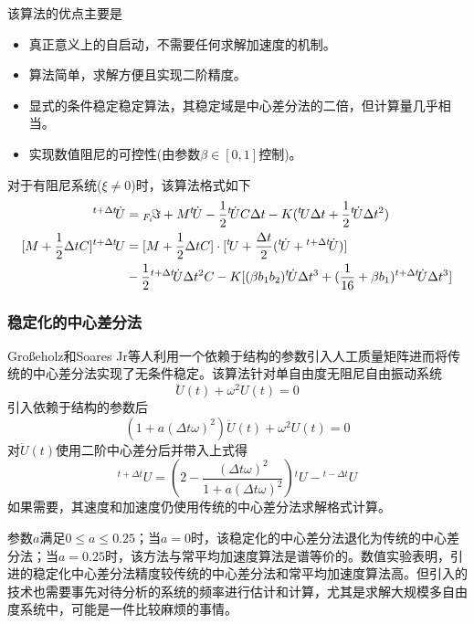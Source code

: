 该算法的优点主要是
\begin{itemize}
\item[\ddag] 真正意义上的自启动，不需要任何求解加速度的机制。
\item[\ddag] 算法简单，求解方便且实现二阶精度。
\item[\ddag] 显式的条件稳定稳定算法，其稳定域是中心差分法的二倍，但计算量几乎相当。
\item[\ddag] 实现数值阻尼的可控性(由参数$\beta\in[0,1]$控制)。
\end{itemize}

对于有阻尼系统($\xi\neq0$)时，该算法格式如下
\begin{align}
 [M+\frac{1}{2}\Delta tC]{^{t+\Delta t}\!\dot{U}}&={_{F_i}\!\Im}+M{^t\!\dot{U}}-\frac12{^{t}\!\dot{U}}C\Delta t-K({^t\!U}\Delta t+\frac12{^t\!\dot{U}}\Delta t^2)\\
 [M+\frac{1}{2}\Delta tC]{^{t+\Delta t}\!U}&=[M+\frac{1}{2}\Delta tC]\cdot[{^t\!U}+\frac{\Delta t}{2}({^t\!\dot{U}}+{^{t+\Delta t}\!\dot{U}})]\notag\\
 &-\frac12{^{t+\Delta t}\!\dot{U}}\Delta t^2C-K[(\beta b_1b_2){^t\!\dot{U}}\Delta t^3+(\frac{1}{16}+\beta b_1){^{t+\Delta t}\!\dot{U}}\Delta t^3]
\end{align}




\subsubsection{稳定化的中心差分法}
Gro\ss eholz和Soares Jr等人\cite{Grosseholz2015}利用一个依赖于结构的参数引入人工质量矩阵进而将传统的中心差分法\cite{Chopra2011}实现了无条件稳定。该算法针对单自由度无阻尼自由振动系统
\begin{equation}
\ddot{U}(t)+\omega^2U(t)=0
\end{equation}
引入依赖于结构的参数后
\begin{equation}
(1+a(\Delta t\omega)^2)\ddot{U}(t)+\omega^2U(t)=0
\end{equation}
对$\ddot{U}(t)$使用二阶中心差分后并带入上式得
\begin{equation}
{^{t+\Delta t}\!U}=\left(2-\frac{(\Delta t\omega)^2}{1+a(\Delta t\omega)^2}\right){^t\!U}-{^{t-\Delta t}\!U}
\end{equation}
如果需要，其速度和加速度仍使用传统的中心差分法求解格式\cite{Chopra2011}计算。

参数$a$满足$0\le a\le0.25$；当$a=0$时，该稳定化的中心差分法退化为传统的中心差分法\cite{Chopra2011}；当$a=0.25$时，该方法与常平均加速度算法\cite{book:dover}是谱等价的。数值实验表明，引进的稳定化中心差分法精度较传统的中心差分法和常平均加速度算法高。但引入的技术也需要事先对待分析的系统的频率进行估计和计算，尤其是求解大规模多自由度系统中，可能是一件比较麻烦的事情。


